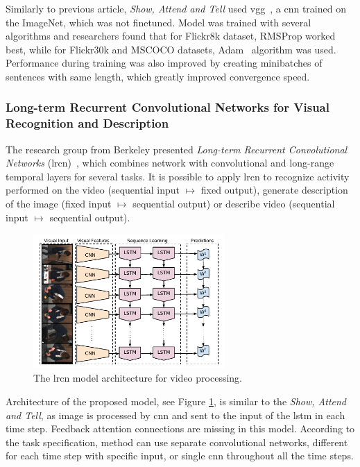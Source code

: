 Similarly to previous article, \emph{Show, Attend and Tell} used \gls{vgg}~\cite{DBLP:journals/corr/SimonyanZ14a}, a \gls{cnn} trained on the ImageNet, which was not finetuned. Model was trained with several algorithms and researchers found that for Flickr8k dataset, RMSProp worked best, while for Flickr30k and MSCOCO datasets, Adam~\cite{DBLP:journals/corr/KingmaB14} algorithm was used. Performance during training was also improved by creating minibatches of sentences with same length, which greatly improved convergence speed.

\subsubsection{Long-term Recurrent Convolutional Networks for Visual Recognition and Description}

The research group from Berkeley presented \emph{Long-term Recurrent Convolutional Networks} (\gls{lrcn})~\cite{DBLP:journals/corr/DonahueHGRVSD14}, which combines network  with convolutional and long-range temporal layers for several tasks. It is possible to apply \gls{lrcn} to recognize activity performed on the video (sequential input $ \mapsto $ fixed output), generate description  of the image (fixed input $ \mapsto $ sequential output) or describe video (sequential input $ \mapsto $ sequential output).

\begin{figure}[!t]
	\centering
	\includegraphics[width=0.65\textwidth]{./fig/long-term-rec-con_architecture.pdf}
	\caption{The \gls{lrcn} model architecture for video processing.~\cite{DBLP:journals/corr/DonahueHGRVSD14}
		\label{fig:lrcn}}
\end{figure}

Architecture of the proposed model, see Figure \ref{fig:lrcn}, is similar to the \emph{Show, Attend and Tell}, as image is processed by \gls{cnn} and sent to the input of the \gls{lstm} in each time step. Feedback attention connections are missing in this model. According to the task specification, method can use separate convolutional networks, different for each time step with specific input, or single \gls{cnn} throughout all the time steps.

